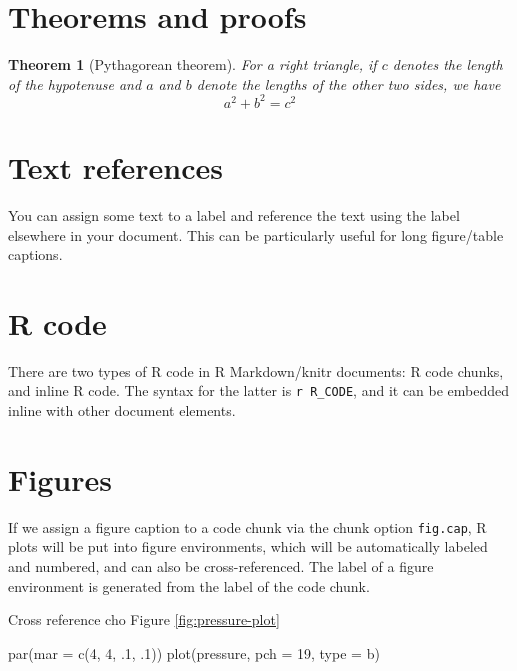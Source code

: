 \documentclass[
]{book}
\newenvironment{Shaded}{\begin{snugshade}}{\end{snugshade}}
\newcommand{\AttributeTok}[1]{\textcolor[rgb]{0.77,0.63,0.00}{#1}}
\newcommand{\DecValTok}[1]{\textcolor[rgb]{0.00,0.00,0.81}{#1}}
\newcommand{\FunctionTok}[1]{\textcolor[rgb]{0.00,0.00,0.00}{#1}}
\newcommand{\NormalTok}[1]{#1}
\newcommand{\StringTok}[1]{\textcolor[rgb]{0.31,0.60,0.02}{#1}}
\newtheorem{theorem}{Theorem}[chapter]
\theoremstyle{definition}
\theoremstyle{definition}
\theoremstyle{definition}
\theoremstyle{definition}
\theoremstyle{remark}
\begin{document}
\hypertarget{theorems-and-proofs}{%
\section{Theorems and proofs}\label{theorems-and-proofs}}

\begin{theorem}[Pythagorean theorem]
For a right triangle, if \(c\) denotes the length of the hypotenuse
and \(a\) and \(b\) denote the lengths of the other two sides, we have
\[a^2 + b^2 = c^2\]
\end{theorem}

\hypertarget{text-references}{%
\section{Text references}\label{text-references}}

You can assign some text to a label and reference the text using the label elsewhere in your document. This can be particularly useful for long figure/table captions.

\hypertarget{r-code}{%
\section{R code}\label{r-code}}

There are two types of R code in R Markdown/knitr documents: R code chunks, and inline R code. The syntax for the latter is \texttt{\textasciigrave{}r\ R\_CODE\textasciigrave{}}, and it can be embedded inline with other document elements.

\hypertarget{figures}{%
\section{Figures}\label{figures}}

If we assign a figure caption to a code chunk via the chunk option \texttt{fig.cap}, R plots will be put into figure environments, which will be automatically labeled and numbered, and can also be cross-referenced. The label of a figure environment is generated from the label of the code chunk.

Cross reference cho Figure \ref{fig:pressure-plot}

\begin{Shaded}
\begin{Highlighting}[]
\FunctionTok{par}\NormalTok{(}\AttributeTok{mar =} \FunctionTok{c}\NormalTok{(}\DecValTok{4}\NormalTok{, }\DecValTok{4}\NormalTok{, .}\DecValTok{1}\NormalTok{, .}\DecValTok{1}\NormalTok{))}
\FunctionTok{plot}\NormalTok{(pressure, }\AttributeTok{pch =} \DecValTok{19}\NormalTok{, }\AttributeTok{type =} \StringTok{\textquotesingle{}b\textquotesingle{}}\NormalTok{)}
\end{Highlighting}
\end{Shaded}
\end{document}
